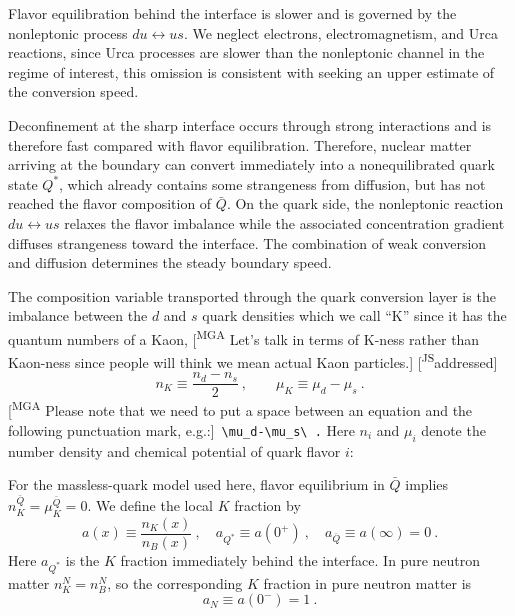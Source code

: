 \documentclass[10pt,superscriptaddress,
amsmath,aps,prc,twocolumn,nofootinbib,floatfix]{revtex4-1}
\newcommand{\mga}[1]{{\color[rgb]{0.8,0,0}#1}}
\newcommand{\mgacom}[1]{\textsf{\color[rgb]{0.7,0,0}[\textsuperscript{MGA} #1]}}
\newcommand{\AHcom}[1]{\textsf{\color{cyan}{\textsuperscript{AH}#1}}}
\newcommand{\JScom}[1]{\textsf{\color{violet} [\textsuperscript{JS}#1]}}
\newcommand{\Qstar}{\ensuremath{Q^*}}
\newcommand{\Qbar}{{\ensuremath{\bar Q}}}
\begin{document}
Flavor equilibration behind the interface is slower and is governed by the nonleptonic process $d u\leftrightarrow u s$.  
We neglect electrons, electromagnetism, and Urca reactions, since Urca processes are slower than the nonleptonic channel in the regime of interest\cite{Alford:2006gy,Alford:2025tbp,Sad:2007afd}, this omission is consistent with seeking an upper estimate of the conversion speed.

Deconfinement at the sharp interface occurs through strong interactions and is
therefore fast compared with flavor equilibration. Therefore, nuclear matter arriving at the boundary can convert immediately into a nonequilibrated quark
state $\Qstar$, which already contains some strangeness from diffusion, but has not reached the
flavor composition of $\Qbar$.  On the quark side, the nonleptonic reaction
$d u\leftrightarrow u s$ relaxes the flavor imbalance while the associated
concentration gradient diffuses strangeness toward the interface.  The
combination of weak conversion and diffusion determines the steady boundary
speed.

The composition variable transported through the quark conversion layer is the \mga{imbalance between the $d$ and $s$ quark densities which we call ``K''
since it has the quantum numbers of a Kaon,} \mgacom{Let's talk in terms of K-ness rather than Kaon-ness since people will think we mean actual Kaon particles.}\JScom{addressed}
\begin{equation}
 n_K \equiv \frac{n_d-n_s}{2}\ ,
 \qquad
 \mu_K\equiv\mu_d-\mu_s\ .
\label{eq:hydro_nK_definition}
\end{equation}
\mgacom{Please note that we need to put a space between an equation and the following punctuation mark, e.g.:}~\verb!\mu_d-\mu_s\ .!
\AHcom{we normally use half spaces: backslash comma}
Here $n_i$ and $\mu_i$ denote the number density and chemical potential of quark flavor $i$:

For the massless-quark model used here, flavor equilibrium in $\Qbar$ implies
$n_K^{\Qbar}=\mu_K^{\Qbar}=0$.
We define the local $K$ fraction by
\begin{equation}
 a(x)\equiv\frac{n_K(x)}{n_B(x)}\ ,
 \quad
 a_{\Qstar}\equiv a(0^+) \ ,
 \quad
 a_{\Qbar}\equiv a(\infty)=0\ .
\label{eq:hydro_a_definition}
\end{equation}
Here $a_{\Qstar}$ is the $K$ fraction immediately behind the interface.  
In pure neutron matter $n_K^N=n_B^N$, so the corresponding $K$ fraction in pure neutron matter is \mga{
\begin{equation} 
a_N\equiv a(0^-)=1 \ .
\end{equation}
}
\end{document}
